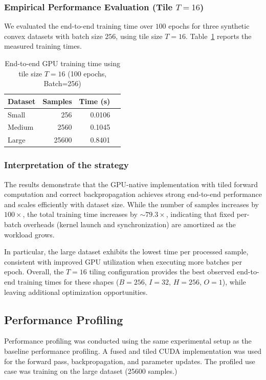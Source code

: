 \documentclass[conference, 12pt]{IEEEtran}
\begin{document}
\subsubsection{Empirical Performance Evaluation (Tile $T=16$)}
We evaluated the end-to-end training time over $100$ epochs for three synthetic convex datasets with batch size $256$, using tile size $T=16$. Table~\ref{tab:fused_tiled_end2end_t16} reports the measured training times.

\begin{table}[h!]
\centering
\caption{End-to-end GPU training time using tile size $T=16$ (100 epochs, Batch=256)}
\label{tab:fused_tiled_end2end_t16}
\begin{tabular}{lrrr}
\toprule
\textbf{Dataset} & \textbf{Samples} & \textbf{Time (s)}  \\
\midrule
Small  & 256   & 0.0106 \\ 
Medium & 2560  & 0.1045  \\
Large  & 25600 & 0.8401 \\
\bottomrule
\end{tabular}
\end{table}
\subsubsection{Interpretation of the strategy}
The results demonstrate that the GPU-native implementation with tiled forward computation and correct backpropagation achieves strong end-to-end performance and scales efficiently with dataset size. While the number of samples increases by $100\times$, the total training time increases by $\sim 79.3\times$, indicating that fixed per-batch overheads (kernel launch and synchronization) are amortized as the workload grows.

In particular, the large dataset exhibits the lowest time per processed sample, consistent with improved GPU utilization when executing more batches per epoch. Overall, the $T=16$ tiling configuration provides the best observed end-to-end training times for these shapes ($B=256$, $I=32$, $H=256$, $O=1$), while leaving additional optimization opportunities.



\subsection{Performance Profiling}

Performance profiling was conducted using the same experimental setup as the baseline performance profiling. A fused and tiled CUDA implementation was used for the forward pass, backpropagation, and parameter updates. The profiled use case was training on the large dataset (25600 samples.)
\end{document}
